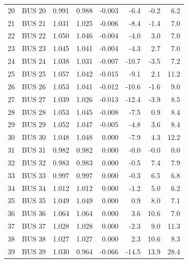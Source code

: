 \documentclass[12pt]{classe_uftex/uftex}
\begin{document}
\begin{longtable}{rlrrrrrr}
20 & BUS 20 & 0.991 & 0.988 & -0.003 & -6.4 & -0.2 & 6.2 \\
21 & BUS 21 & 1.031 & 1.025 & -0.006 & -8.4 & -1.4 & 7.0 \\
22 & BUS 22 & 1.050 & 1.046 & -0.004 & -4.0 & 3.0 & 7.0 \\
23 & BUS 23 & 1.045 & 1.041 & -0.004 & -4.3 & 2.7 & 7.0 \\
24 & BUS 24 & 1.038 & 1.031 & -0.007 & -10.7 & -3.5 & 7.2 \\
25 & BUS 25 & 1.057 & 1.042 & -0.015 & -9.1 & 2.1 & 11.2 \\
26 & BUS 26 & 1.053 & 1.041 & -0.012 & -10.6 & -1.6 & 9.0 \\
27 & BUS 27 & 1.039 & 1.026 & -0.013 & -12.4 & -3.9 & 8.5 \\
28 & BUS 28 & 1.053 & 1.045 & -0.008 & -7.5 & 0.9 & 8.4 \\
29 & BUS 29 & 1.052 & 1.047 & -0.005 & -4.8 & 3.6 & 8.4 \\
30 & BUS 30 & 1.048 & 1.048 & 0.000 & -7.9 & 4.3 & 12.2 \\
31 & BUS 31 & 0.982 & 0.982 & 0.000 & -0.0 & -0.0 & 0.0 \\
32 & BUS 32 & 0.983 & 0.983 & 0.000 & -0.5 & 7.4 & 7.9 \\
33 & BUS 33 & 0.997 & 0.997 & 0.000 & -0.3 & 6.5 & 6.8 \\
34 & BUS 34 & 1.012 & 1.012 & 0.000 & -1.2 & 5.0 & 6.2 \\
35 & BUS 35 & 1.049 & 1.049 & 0.000 & 0.9 & 8.0 & 7.1 \\
36 & BUS 36 & 1.064 & 1.064 & 0.000 & 3.6 & 10.6 & 7.0 \\
37 & BUS 37 & 1.028 & 1.028 & 0.000 & -2.3 & 9.0 & 11.3 \\
38 & BUS 38 & 1.027 & 1.027 & 0.000 & 2.3 & 10.6 & 8.3 \\
39 & BUS 39 & 1.030 & 0.964 & -0.066 & -14.5 & 13.9 & 28.4 \\
\end{longtable}
\normalsize
\end{document}
